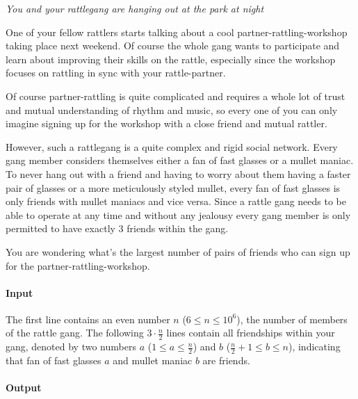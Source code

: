 



\makeheader

\textmusicalnote
\emph{You and your rattlegang are hanging out at the park at night}
\textmusicalnote

One of your fellow rattlers starts talking about a cool partner-rattling-workshop taking place next weekend.
Of course the whole gang wants to participate and learn about improving their skills on the rattle,
especially since the workshop focuses on rattling in sync with your rattle-partner. 

Of course partner-rattling is quite complicated and requires a whole lot of trust and mutual understanding of rhythm and music,
so every one of you can only imagine signing up for the workshop with a close friend and mutual rattler. 

However, such a rattlegang is a quite complex and rigid social network.
Every gang member considers themselves either a fan of fast glasses or a mullet maniac.
To never hang out with a friend and having to worry about them having a faster pair of glasses or a more meticulously styled mullet,
every fan of fast glasses is only friends with mullet maniacs and vice versa.
Since a rattle gang needs to be able to operate at any time and without any jealousy every gang member is only permitted to have exactly 3 friends within the gang.

You are wondering what's the largest number of pairs of friends who can sign up for the partner-rattling-workshop. 

\paragraph*{Input}

The first line contains an even number $n$ ($6 \leq n \leq 10^6$), the number of members of the rattle gang.
The following $3 \cdot \frac{n}{2}$ lines contain all friendships within your gang, denoted by two numbers $a$ ($1 \leq a \leq \frac{n}{2}$) and $b$ ($\frac{n}{2} + 1 \leq b \leq n$), indicating that fan of fast glasses $a$ and mullet maniac $b$ are friends.

\paragraph*{Output}


